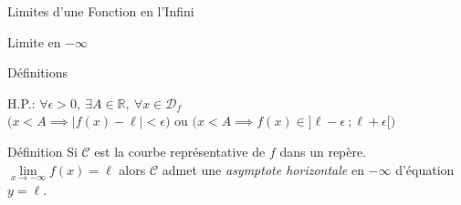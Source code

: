 \documentclass{cours}
\begin{document}
\begin{Gpartie}{Limites d'une Fonction en l'Infini}
\begin{Spartie}{Limite en $-\infty$}
\begin{SSpartie}{Définitions}
\begin{itemize}
\begin{center}
                        \parbox{\linewidth}{}
                    \end{center}
                    \vspace*{2ex}
                    H.P.: $\forall\epsilon >0,~\exists A\in\mathbb{R},~\forall x\in\mathcal{D}_f$ \\ \phantom{H.P.: }$\bigg(x<A\implies\left\lvert f(x)-\ell\right\rvert <\epsilon\bigg)$ ou $\bigg(x<A\implies f(x)\in\big]\ell-\epsilon~;\ell+\epsilon\big[\bigg)$
                \end{itemize}
            \end{SSpartie}
            \begin{SSpartie}{Définition} 
                Si $\mathcal{C}$ est la courbe représentative de $f$ dans un repère. $\lim\limits_{x\to-\infty}f(x)=\ell$ alors $\mathcal{C}$ admet une \emph{asymptote horizontale} en $-\infty$ d'équation $y=\ell$.
            \end{SSpartie}
        \end{Spartie}
    \end{Gpartie}
    \pagebreak
\end{document}
